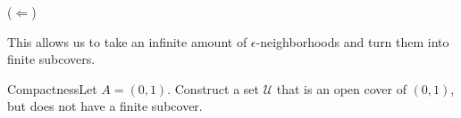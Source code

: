 {\begin{customframedproof}[linecolor=xgray]
\begin{proofpart}[xgray]{(\(\Leftarrow\))}
            \end{proofpart}
    \vspace{2mm}
    \end{customframedproof}
}


\begin{note}
    This allows us to take an infinite amount of \(\epsilon\)-neighborhoods and turn them into finite subcovers.
\end{note}
\begin{example}
    {Compactness}Let \(A = (0,1)\). Construct a set \(\mathcal{U}\) that is an open cover of \((0,1)\), but does not have a finite subcover.
\end{example}






